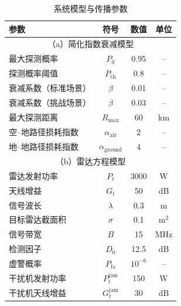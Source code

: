 \begin{table}[h]
\centering
\caption{系统模型与传播参数}
\label{tab:model_params}
\begin{tabular}{lccc}
\toprule
参数 & 符号 & 数值 & 单位 \\
\midrule
\multicolumn{4}{c}{（a）简化指数衰减模型} \\
\midrule
最大探测概率 & $P_0$ & 0.95 & -- \\
探测概率阈值 & $P_{\mathrm{th}}$ & 0.8 & -- \\
衰减系数（标准场景） & $\beta$ & 0.01 & -- \\
衰减系数（挑战场景） & $\beta$ & 0.03 & -- \\
最大探测距离 & $R_{\max}$ & 60 & km \\
空--地路径损耗指数 & $\alpha_{\mathrm{air}}$ & 2 & -- \\
地--地路径损耗指数 & $\alpha_{\mathrm{ground}}$ & 4 & -- \\
\midrule
\multicolumn{4}{c}{（b）雷达方程模型} \\
\midrule
雷达发射功率 & $P_t$ & 3000 & W \\
天线增益 & $G_t$ & 50 & dB \\
信号波长 & $\lambda$ & 0.3 & m \\
目标雷达截面积 & $\sigma$ & 0.1 & m$^2$ \\
信号带宽 & $B$ & 15 & MHz \\
检测因子 & $D_0$ & 12.5 & dB \\
虚警概率 & $P_{\mathrm{fa}}$ & $10^{-6}$ & -- \\
干扰机发射功率 & $P_t^{\mathrm{jam}}$ & 150 & W \\
干扰机天线增益 & $G_t^{\mathrm{jam}}$ & 30 & dB \\
\bottomrule
\end{tabular}
\end{table}
